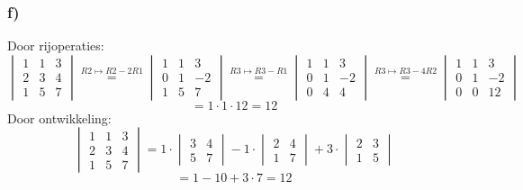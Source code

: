 \documentclass[10pt,a4paper]{article}
\begin{document}
\subsubsection*{f)}
Door rijoperaties:
$$
\begin{vmatrix}
1 & 1 & 3\\
2 & 3 & 4\\
1 & 5 & 7
\end{vmatrix}
\overset{R2 \longmapsto R2-2R1}{=}
\begin{vmatrix}
1 & 1 & 3\\
0 & 1 & -2\\
1 & 5 & 7
\end{vmatrix}
\overset{R3 \longmapsto R3-R1}{=}
\begin{vmatrix}
1 & 1 & 3\\
0 & 1 & -2\\
0 & 4 & 4
\end{vmatrix}
\overset{R3 \longmapsto R3-4R2}{=}
\begin{vmatrix}
1 & 1 & 3\\
0 & 1 & -2\\
0 & 0 & 12
\end{vmatrix}
$$
$$ = 1\cdot 1 \cdot 12 = 12$$
Door ontwikkeling:
$$
\begin{vmatrix}
1 & 1 & 3\\
2 & 3 & 4\\
1 & 5 & 7
\end{vmatrix}
= 1 \cdot
\begin{vmatrix}
3 & 4\\
5 & 7
\end{vmatrix}
- 1 \cdot 
\begin{vmatrix}
2 & 4\\
1 & 7
\end{vmatrix}
+3\cdot
\begin{vmatrix}
2 & 3\\
1 & 5
\end{vmatrix}
$$
$$
= 1 - 10 + 3\cdot 7 = 12
$$
\end{document}
